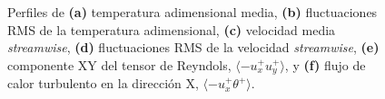 \begin{figure}[H]

 \caption{Perfiles de \textbf{(a)} temperatura adimensional media, \textbf{(b)} fluctuaciones RMS de la temperatura adimensional, \textbf{(c)} velocidad media \textit{streamwise}, \textbf{(d)} fluctuaciones RMS de la velocidad \textit{streamwise}, \textbf{(e)} componente XY del tensor de Reyndols, $\langle -u^+_x u^+_y \rangle$, y \textbf{(f)} flujo de calor turbulento en la dirección X, $\langle -u^+_x \theta^+ \rangle$.} 
 \label{fig:guo-05}
\end{figure}

